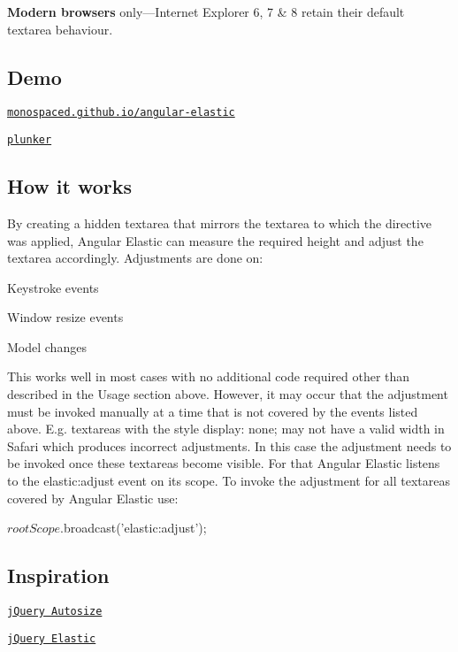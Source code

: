 {\bfseries Modern browsers} only—\+Internet Explorer 6, 7 \& 8 retain their default textarea behaviour.

\subsection*{Demo }


\begin{DoxyItemize}
\item \href{http://monospaced.github.io/angular-elastic}{\tt monospaced.\+github.\+io/angular-\/elastic}
\item \href{http://plnkr.co/edit/9y6YLriAwsK9hqdu72WT?p=preview}{\tt plunker}
\end{DoxyItemize}

\subsection*{How it works }

By creating a hidden textarea that mirrors the textarea to which the directive was applied, Angular Elastic can measure the required height and adjust the textarea accordingly. Adjustments are done on\+:


\begin{DoxyItemize}
\item Keystroke events
\item Window resize events
\item Model changes
\end{DoxyItemize}

This works well in most cases with no additional code required other than described in the Usage section above. However, it may occur that the adjustment must be invoked manually at a time that is not covered by the events listed above. E.\+g. textareas with the style {\ttfamily display\+: none;} may not have a valid width in Safari which produces incorrect adjustments. In this case the adjustment needs to be invoked once these textareas become visible. For that Angular Elastic listens to the {\ttfamily elastic\+:adjust} event on its scope. To invoke the adjustment for all textareas covered by Angular Elastic use\+: \begin{DoxyVerb}$rootScope.$broadcast('elastic:adjust');
\end{DoxyVerb}


\subsection*{Inspiration }


\begin{DoxyItemize}
\item \href{http://www.jacklmoore.com/autosize/}{\tt j\+Query Autosize}
\item \href{http://unwrongest.com/projects/elastic/}{\tt j\+Query Elastic} 
\end{DoxyItemize}
